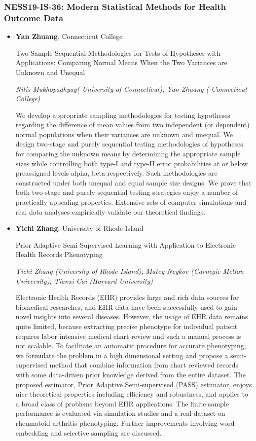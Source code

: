 \subsubsection*{NESS19-IS-36: Modern Statistical Methods for Health Outcome Data}

\begin{itemize}
\item \textbf{Yan Zhuang}, Connecticut College

Two-Sample Sequential Methodologies for Tests of Hypotheses with Applications: Comparing Normal Means When the Two Variances are Unknown and Unequal

\emph{\footnotesize Nitis Mukhopadhyay( University of Connecticut); Yan Zhuang ( Connecticut College)}

We develop appropriate sampling methodologies for testing hypotheses regarding the difference of mean values from two independent (or dependent) normal populations when their variances are unknown and unequal. We design two-stage and purely sequential testing methodologies of hypotheses for comparing the unknown means by determining the appropriate sample sizes while controlling both type-I and type-II error probabilities at or below preassigned levels alpha, beta respectively. Such methodologies are constructed under both unequal and equal sample size designs. We prove that both two-stage and purely sequential testing strategies enjoy a number of practically appealing properties. Extensive sets of computer simulations and real data analyses empirically validate our theoretical findings.

\item \textbf{Yichi Zhang}, University of Rhode Island

Prior Adaptive Semi-Supervised Learning with Application to Electronic Health Records Phenotyping

\emph{\footnotesize Yichi Zhang (University of Rhode Island); Matey Neykov (Carnegie Mellon University); Tianxi Cai (Harvard University)}

Electronic Health Records (EHR) provides large and rich data sources for biomedical researches, and EHR data have been successfully used to gain novel insights into several diseases. However, the usage of EHR data remains quite limited,  because extracting precise phenotype for individual patient requires labor intensive medical chart review and such a manual process is not scalable. To facilitate an automatic procedure for accurate phenotyping, we formulate the problem in a high dimensional setting and propose a semi-supervised method that combine information from chart reviewed records with some data-driven prior knowledge derived from the entire dataset. The proposed estimator, Prior Adaptive Semi-supervised (PASS) estimator, enjoys nice theoretical properties including efficiency and robustness, and applies to a broad class of problems beyond EHR applications. The finite sample performance is evaluated via simulation studies and a real dataset on rheumatoid arthritis phenotyping. Further improvements involving word embedding and selective sampling are discussed.


\end{itemize}
